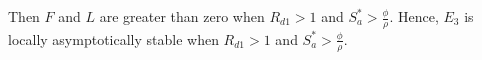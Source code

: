 \documentclass[a4paper]{article}
\begin{document}
Then $F$ and $L$ are greater than zero when $R_{d1} > 1$ and $S_a^* > \frac{\phi}{\rho}$. Hence, $E_3$ is locally asymptotically stable when $R_{d1} > 1$ and $S_a^* > \frac{\phi}{\rho}$.

\end{document}
